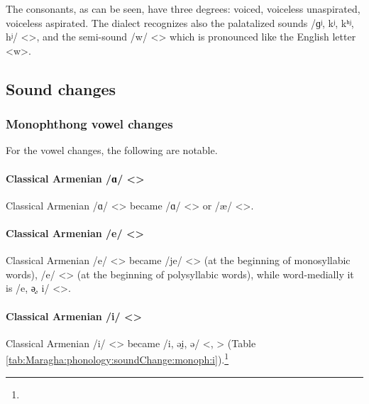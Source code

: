 The consonants, as can be seen, have three degrees: voiced, voiceless unaspirated, voiceless aspirated. The dialect recognizes also the palatalized sounds /ɡʲ, kʲ, kʰʲ, hʲ/ <>, and the semi-sound /w/ <> which is pronounced like the English letter <w>. 

\subsection{Sound changes}
\subsubsection{Monophthong vowel changes}
For the vowel changes, the following are notable.

\paragraph{Classical Armenian /ɑ/ <> }
Classical Armenian /ɑ/ <> became /ɑ/ <> or /æ/ <>.

\paragraph{Classical Armenian /e/ <> }
Classical Armenian /e/ <> became /je/ <> (at the beginning of monosyllabic words), /e/ <> (at the beginning of polysyllabic words), while word-medially it is /e, ə̟, i/ <>.





\begin{adjarianpage}\label{page:282}\end{adjarianpage}%


\paragraph{Classical Armenian /i/ <> }
Classical Armenian /i/ <> became /i, əi̯, ə/ <, > (Table \ref{tab:Maragha:phonology:soundChange:monoph:i}).\footnote{}





